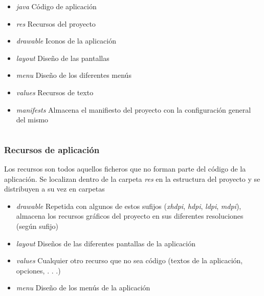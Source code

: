 \documentclass[xcolor={dvipsnames}]{beamer}
\begin{document}
\begin{frame}
\begin{columns}
        \pause
        \begin{column}{6cm}
        \begin{block}{}
        \begin{itemize}
            \item \emph{\textcolor{resalta}{java}} Código de aplicación
            \item \emph{\textcolor{resalta}{res}} Recursos del proyecto
            \item \emph{\textcolor{resalta}{drawable}} Iconos de la aplicación
            \item \emph{\textcolor{resalta}{layout}} Diseño de las pantallas
            \item \emph{\textcolor{resalta}{menu}} Diseño de los diferentes menús
            \item \emph{\textcolor{resalta}{values}} Recursos de texto
            \item \emph{\textcolor{resalta}{manifests}} Almacena el manifiesto del proyecto con la configuración general del mismo
        \end{itemize}
        \end{block}
        \end{column}
        \end{columns}
    \end{frame}

\begin{frame}\frametitle{Recursos de aplicación}
    \begin{block}{}
    Los recursos son todos aquellos ficheros que no forman parte del código de la aplicación. Se localizan dentro de la carpeta
    \emph{\textcolor{resalta}{res}}
    en la estructura del proyecto y se distribuyen a su vez en carpetas
    \end{block}
    \begin{itemize}
        \pause \item \emph{\textcolor{resalta}{drawable}} Repetida con algunos de estos sufijos (\emph{xhdpi}, \emph{hdpi}, \emph{ldpi}, \emph{mdpi}),
        almacena los recursos gráficos del proyecto en sus diferentes resoluciones (según sufijo)
        \pause \item \emph{\textcolor{resalta}{layout}} Diseños de las diferentes pantallas de la aplicación
        \pause \item \emph{\textcolor{resalta}{values}} Cualquier otro recurso que no sea código (textos de la aplicación, opciones, . . .)
        \pause \item \emph{\textcolor{resalta}{menu}} Diseño de los menús de la aplicación
    \end{itemize}
\end{frame}
\end{document}
